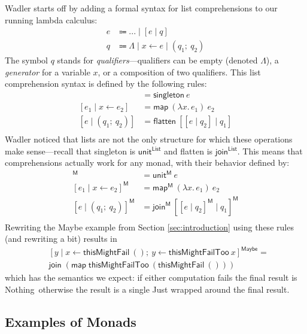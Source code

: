 \documentclass[acmsmall, nonacm, screen]{acmart}
\newcommand{\lambdaE}[2]{\lambda #1.\, #2}
\newcommand{\nothing}{\textsf{Nothing}}
\newcommand{\map}[3]{\textsf{map}^{\textsf{#1}}~#2~#3}
\newcommand{\unit}[2]{\textsf{unit}^{\textsf{#1}}~#2}
\newcommand{\join}[2]{\textsf{join}^{\textsf{#1}}~#2}
\begin{document}
Wadler starts off by adding a formal syntax for list comprehensions to our running lambda calculus:
\begin{align*}
 e &\Coloneqq ... \mid [e \mid q] \\
 q &\Coloneqq \Lambda \mid x \leftarrow e \mid (q_1;\ q_2)
\end{align*}
The symbol $q$ stands for {\em qualifiers}---qualifiers can be empty (denoted $\Lambda$), a {\em
generator} for a variable $x$, or a composition of two qualifiers. This list comprehension syntax
is defined by the following rules:
\begin{align*}
  [e \mid \Lambda] &= \textsf{singleton}~e \\
  [e_1 \mid x \leftarrow e_2] &= \textsf{map}~(\lambdaE{x}{e_1})~e_2 \\
  [e \mid (q_1;\ q_2)] &= \textsf{flatten}~[[e \mid q_2] \mid q_1] \\
\end{align*}
Wadler noticed that lists are not the only structure for which these operations make
sense---recall that \textsf{singleton} is $\textsf{unit}^{\textsf{List}}$ and \textsf{flatten} is
$\textsf{join}^{\textsf{List}}$. This means that comprehensions actually work for any monad, with
their behavior defined by:
\begin{align*}
  [e \mid \Lambda]^{\textsf{M}} &= \unit{M}{e} \\
  [e_1 \mid x \leftarrow e_2]^{\textsf{M}} &= \map{M}{(\lambdaE{x}{e_1})}{e_2} \\
  [e \mid (q_1;\ q_2)]^{\textsf{M}} &= \join{M}{[[e \mid q_2]^{\textsf{M}} \mid q_1]^{\textsf{M}}} \\
\end{align*}
Rewriting the \textsf{Maybe} example from Section \ref{sec:introduction} using these rules (and
rewriting a bit) results in
\begin{align*}
  &[ y \mid x \leftarrow \textsf{thisMightFail}~() ;\ y \leftarrow \textsf{thisMightFailToo}~{x} ]^{\textsf{Maybe}} = \\
  &\join{}{(\map{}{\textsf{thisMightFailToo}}{(\textsf{thisMightFail}~())})}
\end{align*}
which has the semantics we expect: if either computation fails the final result is \nothing\,
otherwise the result is a single \textsf{Just} wrapped around the final result.

\subsection{Examples of Monads}
\end{document}
